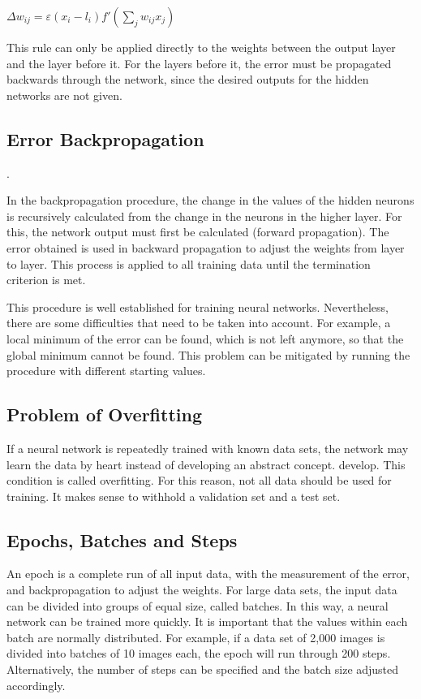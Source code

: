 \begin{center}
$\Delta w_{ij} = \varepsilon  (x_i - l_i)  f'(\sum_{j} w_{ij} x_j) $
\end{center}

This rule can only be applied directly to the weights between the output layer and the layer before it. For the layers before it, the error must be propagated backwards through the network, since the desired outputs for the hidden networks are not given. \cite{Kruse:2015} 

\subsection{Error Backpropagation}. 

In the backpropagation procedure, the change in the values of the hidden neurons is recursively calculated from the change in the neurons in the higher layer. For this, the network output must first be calculated (forward propagation). The error obtained is used in backward propagation to adjust the weights from layer to layer. This process is applied to all training data until the termination criterion is met. \cite{Ertel:2016}

This procedure is well established for training neural networks. Nevertheless, there are some difficulties that need to be taken into account. For example, a local minimum of the error can be found, which is not left anymore, so that the global minimum cannot be found. This problem can be mitigated by running the procedure with different starting values. \cite{Kruse:2015}

\subsection{Problem of Overfitting}

If a neural network is repeatedly trained with known data sets, the network may learn the data by heart instead of developing an abstract concept.
develop. This condition is called overfitting. For this reason, not all data should be used for training. It makes sense to withhold a validation set and a test set. \cite{Becker:2018}

	
	
\subsection{Epochs, Batches and Steps}

An epoch is a complete run of all input data, with the measurement of the error, and backpropagation to adjust the weights. For large data sets, the input data can be divided into groups of equal size, called batches. In this way, a neural network can be trained more quickly. It is important that the values within each batch are normally distributed. For example, if a data set of 2,000 images is divided into batches of 10 images each, the epoch will run through 200 steps. Alternatively, the number of steps can be specified and the batch size adjusted accordingly.\cite{Becker:2018b}

